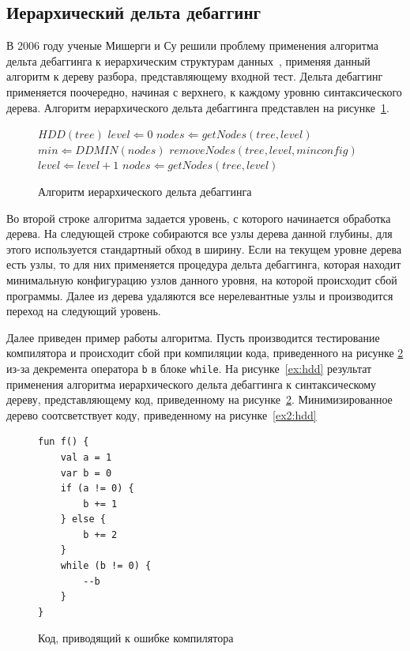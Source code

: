 \subsection{Иерархический дельта дебаггинг}
В 2006 году ученые Мишерги и Су решили проблему применения алгоритма дельта дебаггинга к иерархическим структурам данных~\cite{misherghi2006hdd}, применяя данный алгоритм к дереву разбора, представляющему входной тест. Дельта дебаггинг применяется поочередно, начиная с верхнего, к каждому уровню синтаксического дерева. Алгоритм иерархического дельта дебаггинга представлен на рисунке~\ref{alg:hdd}. 

\begin{figure}[h]
\begin{algorithmic}[1]
\STATE $HDD(tree)$
\STATE $level \Leftarrow 0$
\STATE $nodes \Leftarrow getNodes(tree, level)$
	\STATE $min \Leftarrow DDMIN(nodes)$
	\STATE $removeNodes(tree, level, minconfig)$
	\STATE $level \Leftarrow level + 1$
	\STATE $nodes \Leftarrow getNodes(tree, level)$
\ENDWHILE
\end{algorithmic}
\caption{Алгоритм иерархического дельта дебаггинга}
\label{alg:hdd}
\end{figure}

Во второй строке алгоритма задается уровень, с которого начинается обработка дерева. На следующей строке собираются все узлы дерева данной глубины, для этого используется стандартный обход в ширину. Если на текущем уровне дерева есть узлы, то для них применяется процедура дельта дебаггинга, которая находит минимальную конфигурацию узлов данного уровня, на которой происходит сбой программы. Далее из дерева удаляются все нерелевантные узлы и производится переход на следующий уровень. 

Далее приведен пример работы алгоритма. Пусть производится тестирование компилятора и происходит сбой при компиляции кода, приведенного на рисунке \ref{ex1:hdd} из-за декремента оператора \texttt{b} в блоке \texttt{while}. На рисунке~\ref{ex:hdd} результат применения алгоритма иерархического дельта дебаггинга к синтаксическому дереву, представляющему код, приведенному на рисунке~\ref{ex1:hdd}. Минимизированное дерево соотсветствует коду, приведенному на рисунке~\ref{ex2:hdd}
\begin{figure}
\begin{lstlisting}
fun f() {
    val a = 1
    var b = 0
    if (a != 0) {
        b += 1
    } else {
        b += 2
    }
    while (b != 0) {
        --b
    }
}
\end{lstlisting}
\caption{\label{ex1:hdd}Код, приводящий к ошибке компилятора}
\end{figure}


